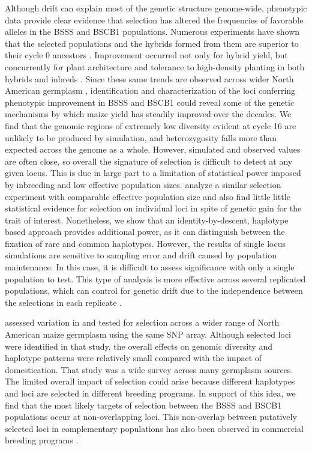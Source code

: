 \documentclass[twocolumn,twoside,letterpaper]{article}
\begin{document}
Although drift can explain most of the genetic structure genome-wide, phenotypic data provide clear evidence that selection has altered the frequencies of favorable alleles in the BSSS and BSCB1 populations. 
Numerous experiments have shown that the selected populations and the hybrids formed from them are superior to their cycle 0 ancestors \citep{smith1983evaluation, keeratinijakal1993responses, schnicker1993interpopulation, holthaus1995population}. 
Improvement occurred not only for hybrid yield, but concurrently for plant architecture and tolerance to high-density planting in both hybrids and inbreds \citep{brekke2011selection, brekke2011selectionb, edwards2011changes, lauer2012morphological}. 
Since these same trends are observed across wider North American germplasm \citep{tollenaar1989genetic}, identification and characterization of the loci conferring phenotypic improvement in BSSS and BSCB1 could reveal some of the genetic mechanisms by which maize yield has steadily improved over the decades. 
We find that the genomic regions of extremely low diversity evident at cycle 16 are unlikely to be produced by simulation, and heterozygosity falls more than expected across the genome as a whole.  
However, simulated and observed values are often close, so overall the signature of selection is difficult to detect at any given locus. 
This is due in large part to a limitation of statistical power imposed by inbreeding and low effective population sizes.
\citet{lorenz2015selection} analyze a similar selection experiment with comparable effective population size and also find little little statistical evidence for selection on individual loci in spite of genetic gain for the trait of interest.
Nonetheless, we show that an identity-by-descent, haplotype based approach provides additional power, as it can distinguish between the fixation of rare and common haplotypes. 
However, the results of single locus simulations are sensitive to sampling error and drift caused by population maintenance. 
In this case, it is difficult to assess significance with only a single population to test. This type of analysis is more effective across several replicated populations, which can control for genetic drift due to the independence between the selections in each replicate \citep{lamkey2014relative}. 
	
\citet{van2012historical} assessed variation in and tested for selection across a wider range of North American maize germplasm using the same SNP array. 
Although selected loci were identified in that study, the overall effects on genomic diversity and haplotype patterns were relatively small compared with the impact of domestication. 
That study was a wide survey across many germplasm sources. 
The limited overall impact of selection could arise because different haplotypes and loci are selected in different breeding programs. 
In support of this idea, we find that the most likely targets of selection between the BSSS and BSCB1 populations occur at non-overlapping loci. 
This non-overlap between putatively selected loci in complementary populations has also been observed in commercial breeding programs \citep{feng2006temporal}.
\end{document}
